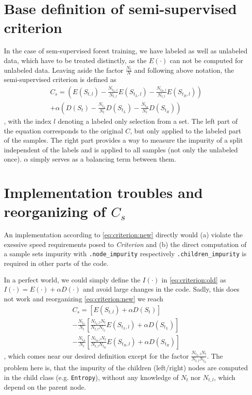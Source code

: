 \documentclass[a4paper,10pt]{article}
\begin{document}
\section{Base definition of semi-supervised criterion}
In the case of sem-supervised forest training, we have labeled as well as unlabeled data, which have to be treated distinctly, as the $E(\cdot)$ can not be computed for unlabeled data. Leaving aside the factor $\frac{N_t}{N}$ and following above notation, the semi-supervised criterion is defined as
\begin{multline}\label{eq:criterion:new}
  C_s=\left(E(S_{t,l}) - \frac{N_{t_L,l}}{N_{t,l}} E(S_{t_L,l}) - \frac{N_{t_R,l}}{N_{t,l}} E(S_{t_R,l})\right)\\+ \alpha\left(D(S_t) - \frac{N_{t_L}}{N_t} D(S_{t_L}) - \frac{N_{t_R}}{N_t} D(S_{t_R})\right)
\end{multline}
, with the index $l$ denoting a labeled only selection from a set. The left part of the equation corresponds to the original $C$, but only applied to the labeled part of the samples. The right part provides a way to measure the impurity of a split independent of the labels and is applied to all samples (not only the unlabeled once). $\alpha$ simply serves as a balancing term between them.

\section{Implementation troubles and reorganizing of $C_s$}
An implementation according to \eqref{eq:criterion:new} directly would (a) violate the exessive speed requirements posed to \textit{Criterion}  and (b) the direct computation of a sample sets impurity with \texttt{.node\_impurity} respectively \texttt{.children\_impurity} is required in other parts of the code.

In a perfect world, we could simply define the $I(\cdot)$ in \eqref{eq:criterion:old} as $I(\cdot)=E(\cdot)+\alpha D(\cdot)$ and avoid large changes in the code. Sadly, this does not work and reorganizing \eqref{eq:criterion:new} we reach
\begin{multline}\label{eq:criterion:new:reorganized}
  C_s=\left[E(S_{t,l}) + \alpha D(S_t)\right]\\
      - \frac{N_{t_L}}{N_t} \left[\frac{N_{t_L,l}N_t}{N_{t,l}N_{t_L}} E(S_{t_L,l}) + \alpha D(S_{t_L})\right]\\
      - \frac{N_{t_R}}{N_t} \left[\frac{N_{t_R,l}N_t}{N_{t,l}N_{t_R}} E(S_{t_R,l}) + \alpha D(S_{t_R})\right]
\end{multline}
, which comes near our desired definition except for the factor $\frac{N_{t_L,l}N_t}{N_{t,l}N_{t_L}}$. The problem here is, that the impurity of the children (left/right) nodes are computed in the child class (e.g. \texttt{Entropy}), without any knowledge of $N_t$ nor $N_{t,l}$, which depend on the parent node.
\end{document}

